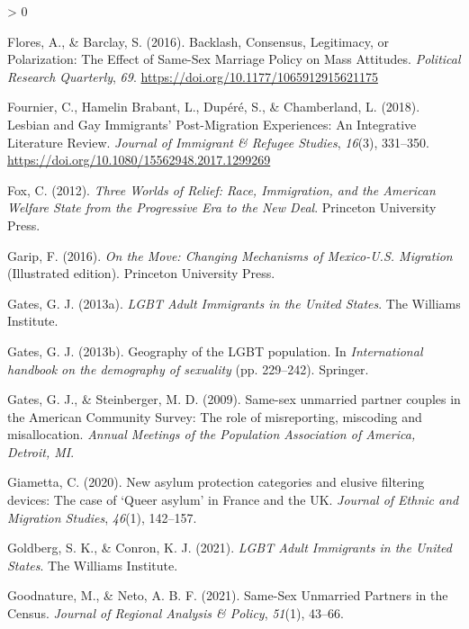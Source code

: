 \documentclass[
  12pt,
]{article}
\newlength{\cslhangindent}
\newenvironment{CSLReferences}[2] %
 {%
  \setlength{\parindent}{0pt}
  \ifodd #1 \everypar{\setlength{\hangindent}{\cslhangindent}}\ignorespaces\fi
  \ifnum #2 > 0
  \setlength{\parskip}{#2\baselineskip}
  \fi
 }%
 {}
\begin{document}
\begin{CSLReferences}{1}{0}
\leavevmode\hypertarget{ref-flores_2016_backlash}{}%
Flores, A., \& Barclay, S. (2016). Backlash, {Consensus}, {Legitimacy}, or {Polarization}: The {Effect} of {Same}-{Sex Marriage Policy} on {Mass Attitudes}. \emph{Political Research Quarterly}, \emph{69}. \url{https://doi.org/10.1177/1065912915621175}

\leavevmode\hypertarget{ref-fournier_2018_lesbian}{}%
Fournier, C., Hamelin Brabant, L., Dupéré, S., \& Chamberland, L. (2018). Lesbian and {Gay Immigrants}' {Post}-{Migration Experiences}: An {Integrative Literature Review}. \emph{Journal of Immigrant \& Refugee Studies}, \emph{16}(3), 331--350. \url{https://doi.org/10.1080/15562948.2017.1299269}

\leavevmode\hypertarget{ref-fox_2012}{}%
Fox, C. (2012). \emph{Three {Worlds} of {Relief}: Race, {Immigration}, and the {American Welfare State} from the {Progressive Era} to the {New Deal}}. {Princeton University Press}.

\leavevmode\hypertarget{ref-garip_2016}{}%
Garip, F. (2016). \emph{On the {Move}: Changing {Mechanisms} of {Mexico}-{U}.{S}. {Migration}} (Illustrated edition). {Princeton University Press}.

\leavevmode\hypertarget{ref-gates_2013}{}%
Gates, G. J. (2013a). \emph{{LGBT Adult Immigrants} in the {United States}}. {The Williams Institute}.

\leavevmode\hypertarget{ref-gates_2013a}{}%
Gates, G. J. (2013b). Geography of the {LGBT} population. In \emph{International handbook on the demography of sexuality} (pp. 229--242). {Springer}.

\leavevmode\hypertarget{ref-gates_2009}{}%
Gates, G. J., \& Steinberger, M. D. (2009). Same-sex unmarried partner couples in the {American Community Survey}: The role of misreporting, miscoding and misallocation. \emph{Annual Meetings of the Population Association of America, Detroit, {MI}}.

\leavevmode\hypertarget{ref-giametta_2020}{}%
Giametta, C. (2020). New asylum protection categories and elusive filtering devices: The case of {`{Queer} asylum'} in {France} and the {UK}. \emph{Journal of Ethnic and Migration Studies}, \emph{46}(1), 142--157.

\leavevmode\hypertarget{ref-goldberg_2021}{}%
Goldberg, S. K., \& Conron, K. J. (2021). \emph{{LGBT Adult Immigrants} in the {United States}}. {The Williams Institute}.

\leavevmode\hypertarget{ref-goodnature_2021}{}%
Goodnature, M., \& Neto, A. B. F. (2021). Same-{Sex Unmarried Partners} in the {Census}. \emph{Journal of Regional Analysis \& Policy}, \emph{51}(1), 43--66.


\end{CSLReferences}
\end{document}

